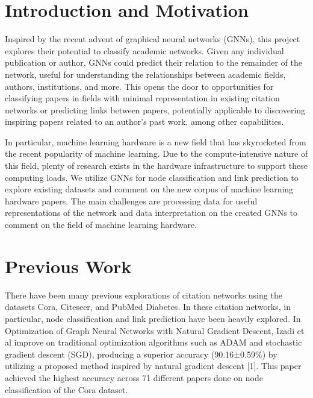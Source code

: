 \documentclass[conference]{IEEEtran}
\begin{document}

\section{Introduction and Motivation}
Inspired by the recent advent of graphical neural networks (GNNs), this project explores their potential to classify academic networks. 
Given any individual publication or author, GNNs could predict their relation to the remainder of the network, 
useful for understanding the relationships between academic fields, authors, institutions, and more. This opens the door to 
opportunities for classifying papers in fields with minimal representation in existing citation networks or predicting links 
between papers, potentially applicable to discovering inspiring papers related to an author's past work, 
among other capabilities. \par

In particular, machine learning hardware is a new field that has skyrocketed from the recent popularity of machine learning. 
Due to the compute-intensive nature of this field, plenty of research exists in the hardware infrastructure to support these 
computing loads. We utilize GNNs for node classification and link prediction to explore existing datasets and comment on the 
new corpus of machine learning hardware papers. The main challenges are processing data for useful representations of the network 
and data interpretation on the created GNNs to comment on the field of machine learning hardware. \par

\section{Previous Work}
There have been many previous explorations of citation networks using the datasets Cora, Citeseer, and PubMed Diabetes. 
In these citation networks, in particular, node classification and link prediction have been heavily explored. 
In Optimization of Graph Neural Networks with Natural Gradient Descent, Izadi et al improve on traditional optimization 
algorithms such as ADAM and stochastic gradient descent (SGD), producing a superior accuracy (90.16±0.59\%) 
by utilizing a proposed method inspired by natural gradient descent [1]. This paper achieved the highest accuracy across 
71 different papers done on node classification of the Cora dataset.  \par
\end{document}
